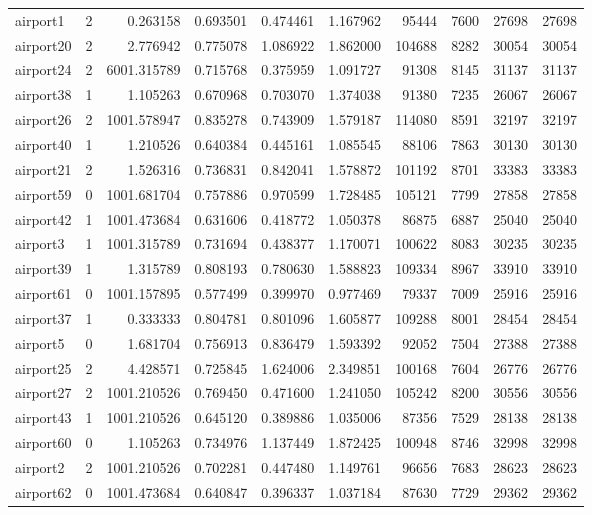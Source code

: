 \documentclass[../../../thesis.tex]{subfiles}
\begin{document}
\begin{longtable}{|l|r|r|r|r|r|r|r|r|r|}
airport1 & 2 & 0.263158 & 0.693501 & 0.474461 & 1.167962 & 95444 & 7600 & 27698 & 27698 \\
airport20 & 2 & 2.776942 & 0.775078 & 1.086922 & 1.862000 & 104688 & 8282 & 30054 & 30054 \\
airport24 & 2 & 6001.315789 & 0.715768 & 0.375959 & 1.091727 & 91308 & 8145 & 31137 & 31137 \\
airport38 & 1 & 1.105263 & 0.670968 & 0.703070 & 1.374038 & 91380 & 7235 & 26067 & 26067 \\
airport26 & 2 & 1001.578947 & 0.835278 & 0.743909 & 1.579187 & 114080 & 8591 & 32197 & 32197 \\
airport40 & 1 & 1.210526 & 0.640384 & 0.445161 & 1.085545 & 88106 & 7863 & 30130 & 30130 \\
airport21 & 2 & 1.526316 & 0.736831 & 0.842041 & 1.578872 & 101192 & 8701 & 33383 & 33383 \\
airport59 & 0 & 1001.681704 & 0.757886 & 0.970599 & 1.728485 & 105121 & 7799 & 27858 & 27858 \\
airport42 & 1 & 1001.473684 & 0.631606 & 0.418772 & 1.050378 & 86875 & 6887 & 25040 & 25040 \\
airport3 & 1 & 1001.315789 & 0.731694 & 0.438377 & 1.170071 & 100622 & 8083 & 30235 & 30235 \\
airport39 & 1 & 1.315789 & 0.808193 & 0.780630 & 1.588823 & 109334 & 8967 & 33910 & 33910 \\
airport61 & 0 & 1001.157895 & 0.577499 & 0.399970 & 0.977469 & 79337 & 7009 & 25916 & 25916 \\
airport37 & 1 & 0.333333 & 0.804781 & 0.801096 & 1.605877 & 109288 & 8001 & 28454 & 28454 \\
airport5 & 0 & 1.681704 & 0.756913 & 0.836479 & 1.593392 & 92052 & 7504 & 27388 & 27388 \\
airport25 & 2 & 4.428571 & 0.725845 & 1.624006 & 2.349851 & 100168 & 7604 & 26776 & 26776 \\
airport27 & 2 & 1001.210526 & 0.769450 & 0.471600 & 1.241050 & 105242 & 8200 & 30556 & 30556 \\
airport43 & 1 & 1001.210526 & 0.645120 & 0.389886 & 1.035006 & 87356 & 7529 & 28138 & 28138 \\
airport60 & 0 & 1.105263 & 0.734976 & 1.137449 & 1.872425 & 100948 & 8746 & 32998 & 32998 \\
airport2 & 2 & 1001.210526 & 0.702281 & 0.447480 & 1.149761 & 96656 & 7683 & 28623 & 28623 \\
airport62 & 0 & 1001.473684 & 0.640847 & 0.396337 & 1.037184 & 87630 & 7729 & 29362 & 29362 \\

\end{longtable}
\end{document}
